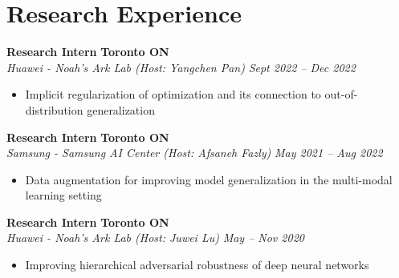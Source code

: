 \section*{Research Experience}
    \vspace{\postsubhead}
      \vspace{\interlist}
      \textbf{Research Intern}
      \hfill
      \textbf{Toronto ON}\\
      \textit{Huawei - Noah's Ark Lab (Host: Yangchen Pan)}
      \hfill
      \textit{Sept 2022 -- Dec 2022}
      \begin{itemize}
        \setlength\itemsep{0.2em}
        \item Implicit regularization of optimization and its connection to out-of-distribution generalization
      \end{itemize}
      \textbf{Research Intern}
      \hfill
      \textbf{Toronto ON}\\
      \textit{Samsung - Samsung AI Center (Host: Afsaneh Fazly)}
      \hfill
      \textit{May 2021 -- Aug 2022}
      \begin{itemize}
        \setlength\itemsep{0.2em}
        \item Data augmentation for improving model generalization in the multi-modal learning setting
      \end{itemize}
      \vspace{\interlist}
      \textbf{Research Intern}
      \hfill
      \textbf{Toronto ON}\\
      \textit{Huawei - Noah's Ark Lab (Host: Juwei Lu)}
      \hfill
      \textit{May -- Nov 2020}
      \begin{itemize}
        \setlength\itemsep{0.2em}
        \item Improving hierarchical adversarial robustness of deep neural networks 
      \end{itemize}
